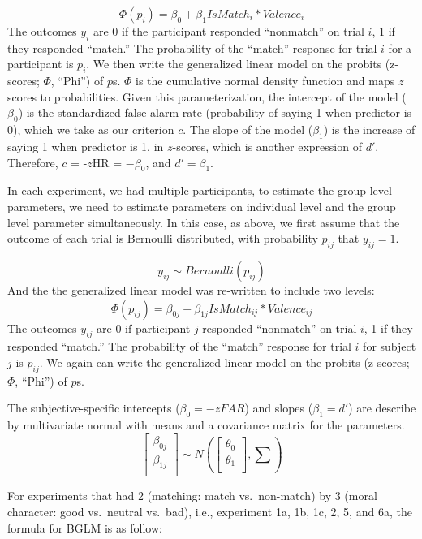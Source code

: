 \documentclass[
  english,
  man]{apa6}
\begin{document}
\[ \Phi(p_{i}) =  \beta_{0} + \beta_{1}IsMatch_{i}  * Valence_{i} \]
The outcomes \(y_{i}\) are 0 if the participant responded ``nonmatch'' on trial \(i\), 1 if they responded ``match.'' The probability of the ``match'' response for trial \(i\) for a participant is \(p_{i}\). We then write the generalized linear model on the probits (z-scores; \(\Phi\), ``Phi'') of \(p\)s. \(\Phi\) is the cumulative normal density function and maps \(z\) scores to probabilities. Given this parameterization, the intercept of the model (\(\beta_0\)) is the standardized false alarm rate (probability of saying 1 when predictor is 0), which we take as our criterion \(c\). The slope of the model (\(\beta_1\)) is the increase of saying 1 when predictor is 1, in \(z\)-scores, which is another expression of \(d'\). Therefore, \(c\) = -\(z\)HR = \(-\beta_0\), and \(d' = \beta_1\).

In each experiment, we had multiple participants, to estimate the group-level parameters, we need to estimate parameters on individual level and the group level parameter simultaneously. In this case, as above, we first assume that the outcome of each trial is Bernoulli distributed, with probability \(p_{ij}\) that \(y_{ij} = 1\).

\[ y_{ij} \sim Bernoulli(p_{ij})\]
And the the generalized linear model was re-written to include two levels:
\[ \Phi(p_{ij}) =  \beta_{0j} + \beta_{1j}IsMatch_{ij} * Valence_{ij}\]
The outcomes \(y_{ij}\) are 0 if participant \(j\) responded ``nonmatch'' on trial \(i\), 1 if they responded ``match.'' The probability of the ``match'' response for trial \(i\) for subject \(j\) is \(p_{ij}\). We again can write the generalized linear model on the probits (z-scores; \(\Phi\), ``Phi'') of \(p\)s.

The subjective-specific intercepts (\(\beta_{0} = -zFAR\)) and slopes (\(\beta_{1} = d'\)) are describe by multivariate normal with means and a covariance matrix for the parameters.
\[ \begin{bmatrix}\beta_{0j}\\
\beta_{1j}\\
\end{bmatrix} \sim N(\begin{bmatrix}\theta_{0}\\
\theta_{1}\\
\end{bmatrix}, \sum) \]

For experiments that had 2 (matching: match vs.~non-match) by 3 (moral character: good vs.~neutral vs.~bad), i.e., experiment 1a, 1b, 1c, 2, 5, and 6a, the formula for BGLM is as follow:
\end{document}

